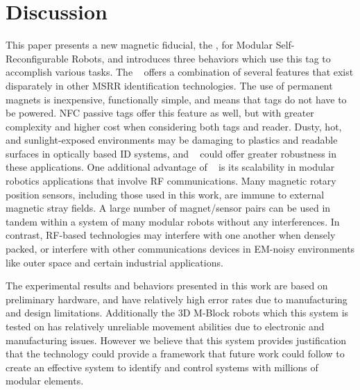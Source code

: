 \section{Discussion}
\label{sec:Discussion}
This paper presents a new magnetic fiducial, the \tagName, for Modular Self-Reconfigurable Robots, and introduces three behaviors which use this tag to accomplish various tasks. The \tagNamePlural~ offers a combination of several features that exist disparately in other MSRR identification technologies. The use of permanent magnets is inexpensive, functionally simple, and means that tags do not have to be powered. NFC passive tags offer this feature as well, but with greater complexity and higher cost when considering both tags and reader. Dusty, hot, and sunlight-exposed environments may be damaging to plastics and readable surfaces in optically based ID systems, and \tagName~ could offer greater robustness in these applications. One additional advantage of \tagName~ is its scalability in modular robotics applications that involve RF communications. Many magnetic rotary position sensors, including those used in this work, are immune to external magnetic stray fields. A large number of magnet/sensor pairs can be used in tandem within a system of many modular robots without any interferences. In contrast, RF-based technologies may interfere with one another when densely packed, or interfere with other communications devices in EM-noisy environments like outer space and certain industrial applications.

The experimental results and behaviors presented in this work are based on preliminary hardware, and have relatively high error rates due to manufacturing and design limitations. Additionally the 3D M-Block robots which this system is tested on has relatively unreliable movement abilities due to electronic and manufacturing issues. However we believe that this system provides justification that the technology could provide a framework that future work could follow to create an effective system to identify and control systems with millions of modular elements.

